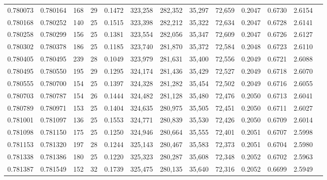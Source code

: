 \begin{tabular}{rrrrrrrrrrrrr}
0.780073 & 0.780164 &   168 &  29 &                                     0.1472 & 323,258 & 282,352 &  35,297 &  72,659 & 0.2047 & 0.6730 & 2.6154 \\
0.780168 & 0.780252 &   140 &  25 &                                     0.1515 & 323,398 & 282,212 &  35,322 &  72,634 & 0.2047 & 0.6728 & 2.6141 \\
0.780258 & 0.780299 &   156 &  25 &                                     0.1381 & 323,554 & 282,056 &  35,347 &  72,609 & 0.2047 & 0.6726 & 2.6127 \\
0.780302 & 0.780378 &   186 &  25 &                                     0.1185 & 323,740 & 281,870 &  35,372 &  72,584 & 0.2048 & 0.6723 & 2.6110 \\
0.780405 & 0.780495 &   239 &  28 &                                     0.1049 & 323,979 & 281,631 &  35,400 &  72,556 & 0.2049 & 0.6721 & 2.6088 \\
0.780495 & 0.780550 &   195 &  29 &                                     0.1295 & 324,174 & 281,436 &  35,429 &  72,527 & 0.2049 & 0.6718 & 2.6070 \\
0.780555 & 0.780700 &   154 &  25 &                                     0.1397 & 324,328 & 281,282 &  35,454 &  72,502 & 0.2049 & 0.6716 & 2.6055 \\
0.780703 & 0.780787 &   154 &  26 &                                     0.1444 & 324,482 & 281,128 &  35,480 &  72,476 & 0.2050 & 0.6713 & 2.6041 \\
0.780789 & 0.780971 &   153 &  25 &                                     0.1404 & 324,635 & 280,975 &  35,505 &  72,451 & 0.2050 & 0.6711 & 2.6027 \\
0.781001 & 0.781097 &   136 &  25 &                                     0.1553 & 324,771 & 280,839 &  35,530 &  72,426 & 0.2050 & 0.6709 & 2.6014 \\
0.781098 & 0.781150 &   175 &  25 &                                     0.1250 & 324,946 & 280,664 &  35,555 &  72,401 & 0.2051 & 0.6707 & 2.5998 \\
0.781153 & 0.781320 &   197 &  28 &                                     0.1244 & 325,143 & 280,467 &  35,583 &  72,373 & 0.2051 & 0.6704 & 2.5980 \\
0.781338 & 0.781386 &   180 &  25 &                                     0.1220 & 325,323 & 280,287 &  35,608 &  72,348 & 0.2052 & 0.6702 & 2.5963 \\
0.781387 & 0.781549 &   152 &  32 &                                     0.1739 & 325,475 & 280,135 &  35,640 &  72,316 & 0.2052 & 0.6699 & 2.5949 \\

\end{tabular}
